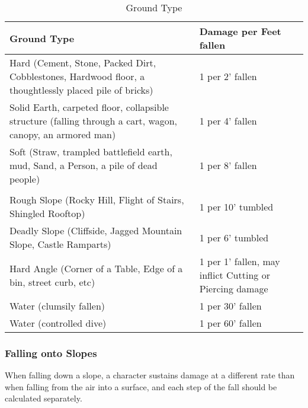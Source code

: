 \documentclass[oneside,11pt,english]{book}
\begin{document}
\begin{table}[ht]
  \centering
	\caption{Ground Type}
	\label{tab:falling-distance}
	\begin{tabu} spread 0pt{X[2]X}
    Ground Type                                                                                                & Damage per Feet fallen                                  \\\toprule
    Hard (Cement, Stone, Packed Dirt, Cobblestones, Hardwood floor, a thoughtlessly placed pile of bricks)     & 1 per 2’ fallen                                         \\
    Solid Earth, carpeted floor, collapsible structure (falling through a cart, wagon, canopy, an armored man) & 1 per 4’ fallen                                         \\
    Soft (Straw, trampled battlefield earth, mud, Sand, a Person, a pile of dead people)                       & 1 per 8’ fallen                                         \\
                                                                                                                                                                         \\
    Rough Slope (Rocky Hill, Flight of Stairs, Shingled Rooftop)                                               & 1 per 10’ tumbled                                       \\
    Deadly Slope (Cliffside, Jagged Mountain Slope, Castle Ramparts)                                           & 1 per 6’ tumbled                                        \\
    Hard Angle (Corner of a Table, Edge of a bin, street curb, etc)                                            & 1 per 1’ fallen, may inflict Cutting or Piercing damage \\ %
    Water (clumsily fallen)                                                                                    & 1 per 30’ fallen                                        \\
    Water (controlled dive)                                                                                    & 1 per 60’ fallen                                        \\
	\end{tabu}
\end{table}

\subsubsection{Falling onto Slopes}
When falling down a slope, a character sustains damage at a different rate than when falling from the air 
into a surface, and each step of the fall should be calculated separately.
\end{document}
